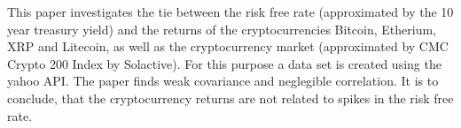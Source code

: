 This paper investigates the tie between the risk free rate (approximated by the 10 year treasury yield) and the returns of the cryptocurrencies Bitcoin, Etherium, XRP and Litecoin, as well as the cryptocurrency market (approximated by CMC Crypto 200 Index by Solactive). For this purpose a data set is created using the yahoo API. The paper finds weak covariance and neglegible correlation. It is to conclude, that the cryptocurrency returns are not related to spikes in the risk free rate.